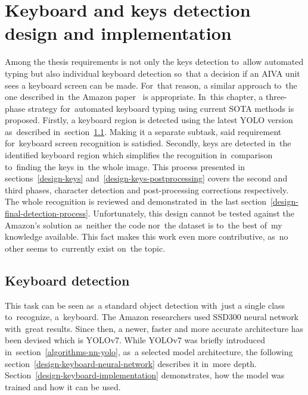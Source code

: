 \chapter{Keyboard and keys detection design and implementation}
\label{design-and-implementation}

Among the thesis requirements is not only the keys detection to~allow automated typing but also individual keyboard detection so~that a decision if an AIVA unit sees a keyboard screen can be made. For~that reason, a similar approach to~the one described in~the Amazon paper~\cite{amazon-paper} is appropriate. In~this chapter, a three-phase strategy for~automated keyboard typing using current SOTA methods is proposed. Firstly, a keyboard region is detected using the latest YOLO version as~described in~section~\ref{design-keyboard}. Making it a separate subtask, said requirement for~keyboard screen recognition is satisfied. Secondly, keys are detected in~the identified keyboard region which simplifies the recognition in~comparison to~finding the keys in~the whole image. This process presented in sections~\ref{design-keys} and~\ref{design-keys-postprocessing} covers the second and third phases, character detection and post-processing corrections respectively. The whole recognition is reviewed and demonstrated in~the last section~\ref{design-final-detection-process}. Unfortunately, this design cannot be tested against the Amazon's solution as~neither the code nor~the dataset is to~the best of~my knowledge available. This fact makes this work even more contributive, as~no other seems to~currently exist on~the topic.

\section{Keyboard detection}
\label{design-keyboard}
This task can be seen as~a standard object detection with~just a single class to~recognize, a~keyboard. The Amazon researchers used SSD300 neural network with~great results. Since then, a newer, faster and more accurate architecture has been devised which is YOLOv7. While YOLOv7 was briefly introduced in~section~\ref{algorithms-nn-yolo}, as~a selected model architecture, the following section~\ref{design-keyboard-neural-network} describes it in~more depth. Section~\ref{design-keyboard-implementation} demonstrates, how the model was trained and how it can be used.

